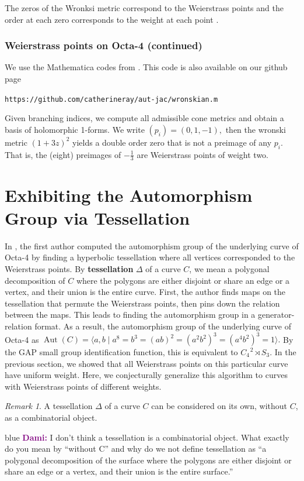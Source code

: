 \documentclass[12pt,reqno]{amsart}
\newenvironment{dami}{
  \medskip
\begin{color}{blue}
    \textcolor{purple}{\textbf{Dami:}} 
}{
\end{color}
  \medskip
}
\DeclareMathOperator{\Aut}{Aut}
\theoremstyle{definition}
\theoremstyle{remark}
\newtheorem*{remark}{Remark}
\begin{document}
The zeros of the Wronksi metric correspond to the Weierstrass points and the order at each zero corresponds to the weight at each point \cite{fk}. 

\subsubsection*{Weierstrass points on Octa-4 (continued)} We use the Mathematica codes from \cite{dthesis}. This code is also available on our github page \begin{center}\texttt{https://github.com/catherineray/aut-jac/wronskian.m}\end{center} Given branching indices, we compute all admissible cone metrics and obtain a basis of holomorphic 1-forms. We write $(p_i) = (0, 1, -1),$ then the wronski metric $(1 + 3 z)^2$ yields a double order zero that is not a preimage of any $p_i.$ That is, the (eight) preimages of $- \frac{1}{3}$ are Weierstrass points of weight two. 



\section{Exhibiting the Automorphism Group via Tessellation}
\label{sec:flagflag}


In \cite{dami}, the first author computed the automorphism group of the underlying curve of Octa-4 by finding a hyperbolic tessellation where all vertices corresponded to the Weierstrass points. By \textbf{tessellation} $\Delta$ of a curve $C$, we mean a polygonal decomposition of $C$ where the polygons are either disjoint or share an edge or a vertex, and their union is the entire curve. First, the author finds maps on the tessellation that permute the Weierstrass points, then pins down the relation between the maps. This leads to finding the automorphism group in a generator-relation format. As a result, the automorphism group of the underlying curve of Octa-4 as $\Aut(C) = \langle a, b \mid a^8 = b^3 = (ab) ^2 = (a^2b^2)^3 = (a^4b^2)^3 = 1 \rangle.$ By the GAP small group identification function, this is equivalent to $C_4^{\text{ }2} \rtimes S_3.$ In the previous section, we showed that all Weierstrass points on this particular curve have uniform weight. Here, we conjecturally generalize this algorithm to curves with Weierstrass points of different weights. 


\begin{remark} A tessellation $\Delta$ of a curve $C$ can be considered on its own, without $C$, as a combinatorial object. \end{remark}
\begin{dami} I don't think a tessellation is a combinatorial object. What exactly do you mean by ``without C'' and why do we not define tessellation as ``a polygonal decomposition of the surface where the polygons are either disjoint or share an edge or a vertex, and their union is the entire surface.''\end{dami}
\end{document}
